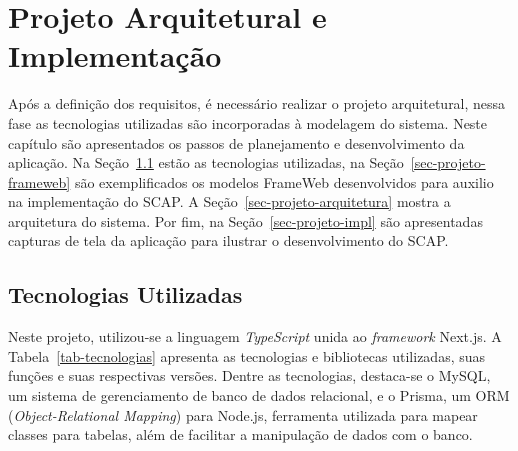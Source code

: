 \chapter{Projeto Arquitetural e Implementação}
\label{chap-projeto}


Após a definição dos requisitos, é necessário realizar o projeto arquitetural, nessa
fase as tecnologias utilizadas são incorporadas à modelagem do sistema. Neste capítulo
são apresentados os passos de planejamento e desenvolvimento da aplicação.
Na Seção~\ref{sec-projeto-tecnologias} estão as tecnologias utilizadas, na Seção~\ref{sec-projeto-frameweb}
são exemplificados os modelos FrameWeb desenvolvidos para auxilio na implementação do SCAP.
A Seção~\ref{sec-projeto-arquitetura} mostra a arquitetura do sistema. 
Por fim, na Seção~\ref{sec-projeto-impl} são apresentadas capturas de tela da aplicação para
ilustrar o desenvolvimento do SCAP.


\section{Tecnologias Utilizadas}
\label{sec-projeto-tecnologias}

Neste projeto, utilizou-se a linguagem \textit{TypeScript} unida ao \textit{framework} Next.js.
A Tabela~\ref{tab-tecnologias} apresenta as tecnologias e bibliotecas utilizadas, suas funções e suas respectivas versões.
Dentre as tecnologias, destaca-se o MySQL, um sistema de gerenciamento de banco de dados relacional,
e o Prisma, um ORM (\textit{Object-Relational Mapping}) para Node.js, ferramenta utilizada
para mapear classes para tabelas, além de facilitar a manipulação de dados com o banco.

